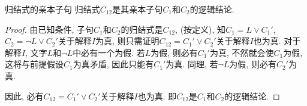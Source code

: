 \begin{mythm}{归结式的亲本子句}{}\label{AIthm3.1}
    归结式$C_{12}$是其亲本子句$C_1 $和$C_2$的逻辑结论.
\end{mythm}
\begin{proof}
由已知条件, 子句$C_1 $和$C_2$的归结式是$C_{12}$, (按定义), 知$C_1 =L\vee C_1 '$, $C_2 =\neg L\vee C_2 '$关于解释$I$为真, 则只需证明$C_{1 2}= C_1' \vee C_2 '$关于解释$I$也为真.
对于解释$I$, 文字$L$和$\neg L$中必有一个为假.
若$L$为假, 则必有$C_1'$为真, 不然就会使$C_1$为假, 这将与前提假设$C_1$为真矛盾, 因此只能有$C_1'$为真.
同理, 若$\neg L$为假, 则必有$C_2'$为真.

因此, 必有$C_{1 2}= C_1 '\vee C_2 '$关于解释$I$也为真. 即$C_{12}$是$C_1$和$C_2$的逻辑结论.
\end{proof}

